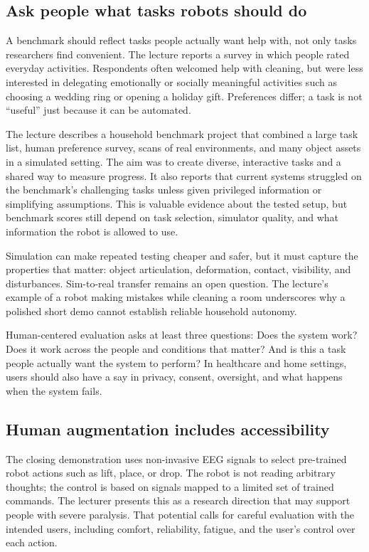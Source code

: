 \subsection{Ask people what tasks robots should do}\label{04-visual-computing-ii-ch034-ask-people-what-tasks-robots-should-do}

A benchmark should reflect tasks people actually want help with, not only tasks researchers find convenient. The lecture reports a survey in which people rated everyday activities. Respondents often welcomed help with cleaning, but were less interested in delegating emotionally or socially meaningful activities such as choosing a wedding ring or opening a holiday gift. Preferences differ; a task is not ``useful'' just because it can be automated.

The lecture describes a household benchmark project that combined a large task list, human preference survey, scans of real environments, and many object assets in a simulated setting. The aim was to create diverse, interactive tasks and a shared way to measure progress. It also reports that current systems struggled on the benchmark's challenging tasks unless given privileged information or simplifying assumptions. This is valuable evidence about the tested setup, but benchmark scores still depend on task selection, simulator quality, and what information the robot is allowed to use.

Simulation can make repeated testing cheaper and safer, but it must capture the properties that matter: object articulation, deformation, contact, visibility, and disturbances. Sim-to-real transfer remains an open question. The lecture's example of a robot making mistakes while cleaning a room underscores why a polished short demo cannot establish reliable household autonomy.

Human-centered evaluation asks at least three questions: Does the system work? Does it work across the people and conditions that matter? And is this a task people actually want the system to perform? In healthcare and home settings, users should also have a say in privacy, consent, oversight, and what happens when the system fails.

\subsection{Human augmentation includes accessibility}\label{04-visual-computing-ii-ch034-human-augmentation-includes-accessibility}

The closing demonstration uses non-invasive EEG signals to select pre-trained robot actions such as lift, place, or drop. The robot is not reading arbitrary thoughts; the control is based on signals mapped to a limited set of trained commands. The lecturer presents this as a research direction that may support people with severe paralysis. That potential calls for careful evaluation with the intended users, including comfort, reliability, fatigue, and the user's control over each action.

